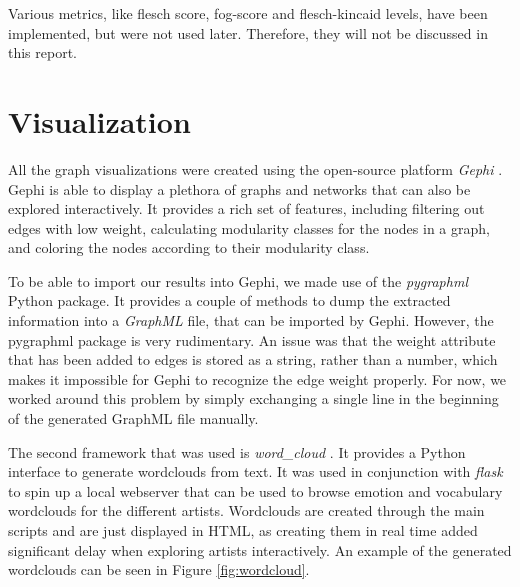 \documentclass[10pt,a4paper]{article}
\begin{document}
	Various metrics, like flesch score, fog-score and flesch-kincaid levels, have been implemented, but were not used later. Therefore, they will not be discussed in this report.
	
	\section{Visualization}
	\label{sec:visualization}
	
	All the graph visualizations were created using the open-source platform \textit{Gephi} \cite{ICWSM09154}. Gephi is able to display a plethora of graphs and networks that can also be explored interactively. It provides a rich set of features, including filtering out edges with low weight, calculating modularity classes for the nodes in a graph, and coloring the nodes according to their modularity class. 
	
	To be able to import our results into Gephi, we made use of the \textit{pygraphml} Python package. It provides a couple of methods to dump the extracted information into a \textit{GraphML} file, that can be imported by Gephi. However, the pygraphml package is very rudimentary. An issue was that the weight attribute that has been added to edges is stored as a string, rather than a number, which makes it impossible for Gephi to recognize the edge weight properly. For now, we worked around this problem by simply exchanging a single line in the beginning of the generated GraphML file manually.
	
	The second framework that was used is \textit{word\_cloud} \cite{wordcloud}. It provides a Python interface to generate wordclouds from text. It was used in conjunction with \textit{flask} \cite{flask} to spin up a local webserver that can be used to browse emotion and vocabulary wordclouds for the different artists. Wordclouds are created through the main scripts and are just displayed in HTML, as creating them in real time added significant delay when exploring artists interactively. An example of the generated wordclouds can be seen in Figure \ref{fig:wordcloud}.
	
\end{document}
